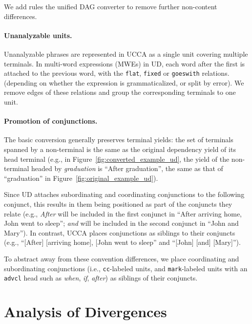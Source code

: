 \documentclass[11pt,a4paper]{article}
\begin{document}
We add rules the unified DAG converter to remove further non-content differences.

\paragraph{Unanalyzable units.}
Unanalyzable phrases are represented in UCCA as a single unit covering multiple terminals.
In multi-word expressions (MWEs) in UD, each word after the first is attached to the previous word,
with the \texttt{flat}, \texttt{fixed} or \texttt{goeswith} relations.
(depending on whether the expression is grammaticalized, or split by error).
We remove edges of these relations and group the corresponding terminals to one unit.

\paragraph{Promotion of conjunctions.}
The basic conversion generally preserves terminal yields:
the set of terminals spanned by a non-terminal is the same
as the original dependency yield of its head terminal
(e.g., in Figure~\ref{fig:converted_example_ud}, the yield of the non-terminal
headed by \textit{graduation} is ``After graduation'', the same as that of ``graduation''
in Figure~\ref{fig:original_example_ud}).

Since UD attaches subordinating and coordinating conjunctions to the following conjunct,
this results in them being positioned as part
of the conjuncts they relate (e.g.,
\textit{After} will be included in the first conjunct in ``After arriving home, John went to sleep'';
\textit{and} will be included in the second conjunct in ``John and Mary'').
In contrast, UCCA places conjunctions as siblings to their conjuncts (e.g.,
``[After] [arriving home], [John went to sleep'' and ``[John] [and] [Mary]''). 

To abstract away from these convention differences,
we place 
coordinating and subordinating conjunctions 
(i.e., \texttt{cc}-labeled units, and \texttt{mark}-labeled units with an \texttt{advcl} head such 
as \textit{when}, \textit{if}, \textit{after}) as siblings of their conjuncts.


\section{Analysis of Divergences}\label{sec:analysis}
\end{document}
